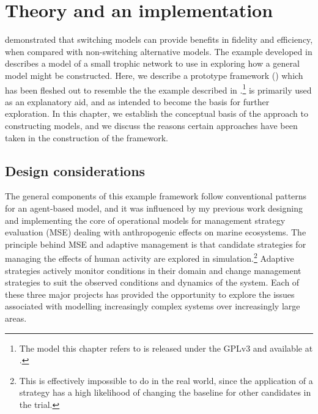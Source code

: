 

\chapter[THEORY AND AN EXAMPLE IMPLEMENTATION]{Theory and an 
implementation}
\WeAreOn{\cfive}\label{explicitmodel}


\Ctwo demonstrated that switching models can provide benefits in
fidelity and efficiency, when compared with non-switching alternative
models.  The example developed in \Cthree describes a model of a small
trophic network to use in exploring how a general model might be
constructed. Here, we describe a prototype framework (\ReModel) which
has been fleshed out to resemble the the example described
in \Cthree.\footnote{The model this chapter refers to is released
under the GPLv3 and available at \repos.} \ReModel is primarily used
as an explanatory aid, and as intended to become the basis for further
exploration. In this chapter, we establish the conceptual basis of the
approach to constructing models, and we discuss the reasons certain
approaches have been taken in the construction of the
framework.  

\section{Design considerations}
The general components of this example framework follow conventional
patterns for an agent-based model, and it was influenced by my
previous work \citep{lyne1994pmez5, gray2006nws, gray2014} designing
and implementing the core of operational models for management
strategy evaluation (MSE) dealing with anthropogenic effects on
marine ecosystems.  The principle behind MSE and adaptive management
is that candidate strategies for managing the effects of human
activity are explored in simulation.\footnote{This is effectively
  impossible to do in the real world, since the application of a
  strategy has a high likelihood of changing the baseline for other
  candidates in the trial.} Adaptive strategies actively monitor
conditions in their domain and change management strategies to suit
the observed conditions and dynamics of the
system. \citep{walters1976,smith1993,polacheck1999,sainsbury2000,keith2011}
Each of these three major projects has provided the opportunity to
explore the issues associated with modelling increasingly complex
systems over increasingly large areas.

